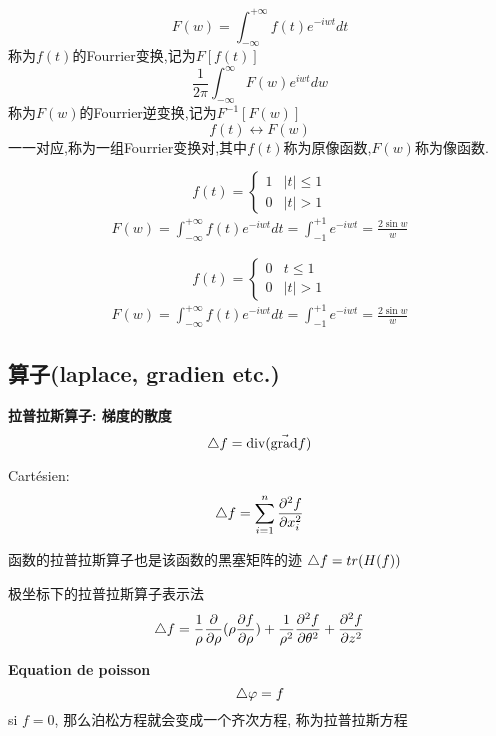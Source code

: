\documentclass{article}
\begin{document}
$$F(w)=\int_{-\infty}^{+\infty}f(t)e^{-iwt}dt$$
称为$f(t)$的Fourrier变换,记为$F[f(t)]$
$$\frac{ 1}{2\pi}\int_{-\infty}^{\infty}F(w)e^{iwt}dw$$称为$F(w)$的Fourrier逆变换,记为$F^{-1}[F(w)]$
$$f(t) \longleftrightarrow F(w)$$一一对应,称为一组Fourrier变换对,其中$f(t)$称为原像函数,$F(w)$称为像函数.
\begin{example}
\begin{equation}
f(t)=
\left\{
		\begin{array}{ll}
			1 & |t| \leq 1 \\
			0 & |t| > 1
		\end{array}
		\right.
\end{equation}
\begin{eqnarray}
 F(w)=\int_{-\infty}^{+\infty} f(t)e^{-iwt}dt=\int_{-1}^{+1}e^{-iwt}=\frac{2\sin w}{w}
\end{eqnarray}
\end{example}

\begin{example}
\begin{equation}
f(t)=
\left\{
		\begin{array}{ll}
			0 & t \leq 1 \\
			0 & |t| > 1
		\end{array}
		\right.
\end{equation}
\begin{eqnarray}
 F(w)=\int_{-\infty}^{+\infty} f(t)e^{-iwt}dt=\int_{-1}^{+1}e^{-iwt}=\frac{2\sin w}{w}
\end{eqnarray}
\end{example}

\subsection{算子(laplace, gradien etc.)}
\textbf{拉普拉斯算子: 梯度的散度}
$$\mathop{}\!\mathbin\bigtriangleup f = \mbox{div} (\vec{\mbox{grad}}f)$$

Cart\'esien: $$\mathop{}\!\mathbin\bigtriangleup f = \sum_{i=1}^n \frac{\partial^2 f }{\partial x_i^2} $$

函数的拉普拉斯算子也是该函数的黑塞矩阵的迹 $\mathop{}\!\mathbin\bigtriangleup f = tr(H(f))$

极坐标下的拉普拉斯算子表示法
$$\mathop{}\!\mathbin\bigtriangleup f = \frac{ 1}{\rho}\frac{\partial  }{\partial \rho}(\rho \frac{\partial  f}{\partial \rho}) + \frac{ 1}{\rho^2}\frac{\partial ^2 f}{\partial\theta^2} + \frac{\partial^2 f}{\partial z^2}$$

\bigskip
\textbf{Equation de poisson}
$$\mathop{}\!\mathbin\bigtriangleup \varphi = f$$
si $f=0$, 那么泊松方程就会变成一个齐次方程, 称为拉普拉斯方程
\end{document}

